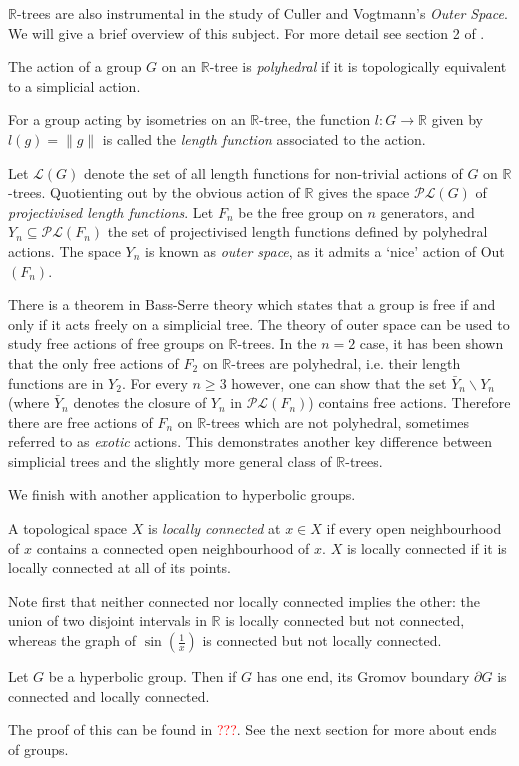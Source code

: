 $\mathbb{R}$-trees are also instrumental in the study of Culler and Vogtmann's \textit{Outer Space}. We will give a brief overview of this subject. For more detail see section 2 of \cite{Shalen}.

\begin{definition}
    The action of a group $G$ on an $\mathbb{R}$-tree is \emph{polyhedral} if it is topologically equivalent to a simplicial action.
\end{definition}
\begin{definition}
    For a group acting by isometries on an $\mathbb{R}$-tree, the function $l:G\rightarrow\mathbb{R}$ given by $l(g)=\lVert g\rVert$ is called the \emph{length function} associated to the action.
\end{definition}

Let $\mathcal{L}(G)$ denote the set of all length functions for non-trivial actions of $G$ on $\mathbb{R}$-trees. Quotienting out by the obvious action of $\mathbb{R}$ gives the space $\mathcal{PL}(G)$ of \textit{projectivised length functions}. Let $F_n$ be the free group on $n$ generators, and $Y_n\subseteq \mathcal{PL}(F_n)$ the set of projectivised length functions defined by polyhedral actions. The space $Y_n$ is known as \textit{outer space}, as it admits a `nice' action of Out$(F_n)$. 

There is a theorem in Bass-Serre theory which states that a group is free if and only if it acts freely on a simplicial tree. The theory of outer space can be used to study free actions of free groups on $\mathbb{R}$-trees. In the $n=2$ case, it has been shown that the only free actions of $F_2$ on $\mathbb{R}$-trees are polyhedral, i.e. their length functions are in $Y_2$. For every $n\geq 3$ however, one can show that the set $\bar{Y}_n\backslash Y_n$ (where $\bar{Y}_n$ denotes the closure of $Y_n$ in $\mathcal{PL}(F_n)$) contains free actions. Therefore there are free actions of $F_n$ on $\mathbb{R}$-trees which are not polyhedral, sometimes referred to as \textit{exotic} actions. This demonstrates another key difference between simplicial trees and the slightly more general class of $\mathbb{R}$-trees.


We finish with another application to hyperbolic groups.
\begin{definition}
    A topological space $X$ is \emph{locally connected} at $x\in X$ if every open neighbourhood of $x$ contains a connected open neighbourhood of $x$. $X$ is locally connected if it is locally connected at all of its points.
\end{definition}
Note first that neither connected nor locally connected implies the other: the union of two disjoint intervals in $\mathbb{R}$ is locally connected but not connected, whereas the graph of $\sin(\frac{1}{x})$ is connected but not locally connected.

\begin{theorem}
    Let $G$ be a hyperbolic group. Then if $G$ has one end, its Gromov boundary $\partial G$ is connected and locally connected.
\end{theorem}

The proof of this can be found in \textcolor{red}{???}. See the next section for more about ends of groups.




